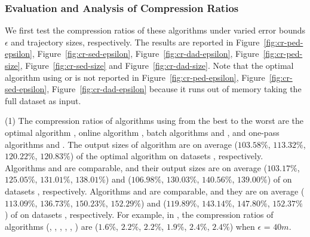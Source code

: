 \vspace{-1ex}
\subsubsection{Evaluation and Analysis of Compression Ratios}


We first test the compression ratios of these algorithms under varied error bounds $\epsilon$ and trajectory sizes, respectively. The results are reported in Figure~\ref{fig:cr-ped-epsilon}, Figure~\ref{fig:cr-sed-epsilon}, Figure~\ref{fig:cr-dad-epsilon}, Figure~\ref{fig:cr-ped-size}, Figure~\ref{fig:cr-sed-size} and Figure~\ref{fig:cr-dad-size}. {Note that the optimal algorithm using \sed or \dad is not reported in Figure~\ref{fig:cr-ped-epsilon}, Figure~\ref{fig:cr-sed-epsilon}, Figure~\ref{fig:cr-dad-epsilon} because it runs out of memory taking the full dataset as input}.

\sstab(1) The compression ratios of algorithms using \ped from the best
to the worst are the optimal algorithm \opt, online algorithm \bqsa, batch algorithms \tpa and
\dpa, and one-pass algorithms \siped and \operb.
The output sizes of algorithm \bqsa are on average
($103.58\%$, $113.32\%$, $120.22\%$, $120.83\%$) of the optimal algorithm \opt
on datasets \dSets, respectively.
Algorithms \tpa and \dpa are comparable, and their output sizes are on average
($103.17\%$, $125.05\%$, $131.01\%$, $138.01\%$) and ($106.98\%$, $130.03\%$, $140.56\%$, $139.00\%$) of \opt
on datasets \dSets, respectively.
Algorithms \siped and \operb are comparable, and they are on average
($113.09\%$, $136.73\%$, $150.23\%$, $152.29\%$)
and ($119.89\%$, $143.14\%$, $147.80\%$, $152.37\%$) of \opt on datasets \dSets, respectively.
%
For example, in \mopsi, the compression ratios of algorithms
(\opt, \tpa, \dpa, \bqsa, \siped, \operb ) are ($1.6\%$, $2.2\%$, $2.2\%$, $1.9\%$, $2.4\%$, $2.4\%$) when $\epsilon$ = $40m$.
%


